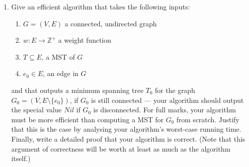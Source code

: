 \documentclass[11pt]{article}
\begin{document}
\begin{enumerate}
\begin{solution}
        \textbf{Proof of correctness} 
        \begin{proposition*}
            The output $T_1$ is a MST for $G_1 =(V, E = E\cup \{ e_1\})$
            \begin{proof}
                By correctness of DFS, when we first explored $(u,v)$, if $v.color$ is $GRAY$, then $(u,v)$ is a back edge, indicating we have found a cycle $c$ in the graph. By the previous lemma and the fact that we started from $s$ where $e_1 = (s,t)$, we will always find such a cycle (i.e. discover $t$ such that $s\in G_1.Adj[t]$ and $s.color$ is $GRAY$). When \textsc{Exit-DFS} is called, the vertices $v\in V$ such that $v.color$ is $GRAY$ represents vertices constituting the cycle $c$. The claim holds since by the time \textsc{Exit-DFS} is called, all ancestors of $t$ has yet to finish (i.e. setting their color to $BLACK$). The subsequent loop over $G_1.E$ finds the maximum weighted edge $e_2$ in the cycle $c$. By the cycle property of MST, $e_2$ cannot be included in any MST of $G_1$. Now consider the return value $T_1 = T \cup \{ e_1 \} \setminus \{e_2 \}$. Now we prove $T_1$ is a MST of $G_1$. Consider $A = T \setminus \{ e_2 \}$, note $A$ breaks into 2 connected components as MST $T$ is connected. Let $C = (P,Q)$ be the cut where $s\in P$ and $t\in Q$, $P\cup Q = A$ and $P\cap Q = \emptyset$. The fact that $e_2 \in T$ implies that $e_2$ is a light edge cross the cut $C$. Now we have $w(e_1) < w(e_2)$ since $e_2$ is the maximum weight edge in the cycle $c$, therefore $e_1$ is the light across the cut $C$. By corollary in CLRS, since $P$ respects the cut $C$ and $e_2$ is a light edge crossing the cut and $P\subseteq T$, therefore $e_2$ is safe for $P$. Therefore $T_1$ is some MST of $G_0$
            \end{proof}
        \end{proposition*}
    \end{solution}


    \item Give an efficient algorithm that takes the following inputs:
        \begin{enumerate}
            \item $G = (V,E)$ a connected, undirected graph 
            \item $w: E\to \mathbb{Z}^+$ a weight function 
            \item $T \subseteq E$, a MST of $G$
            \item $e_0 \in E$, an edge in $G$ 
        \end{enumerate}
        and that outputs a minimum spanning tree $T_0$ for the graph $G_0 = (V ,E \setminus \{e_0\})$, if $G_0$ is still connected — your algorithm should output the special value $Nil$ if $G_0$ is disconnected. For full marks, your algorithm must be more efficient than computing a MST for $G_0$ from scratch. Justify that this is the case by analysing your algorithm’s worst-case running time. Finally, write a detailed proof that your algorithm is correct. (Note that this argument of correctness will be worth at least as much as the algorithm itself.)



\end{enumerate}
\end{document}
